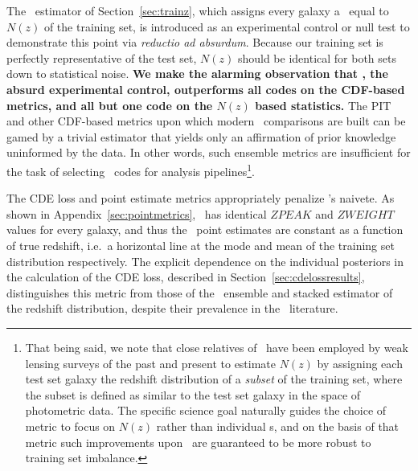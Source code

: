 The \trainz\ estimator of Section~\ref{sec:trainz}, which assigns every galaxy a \pzpdf\ equal to $N(z)$ of the training set, is introduced as an experimental control or null test to demonstrate this point via \textit{reductio ad absurdum}.
Because our training set is perfectly representative of the test set, $N(z)$ should be identical for both sets down to statistical noise.
\textbf{We make the alarming observation that \trainz, the absurd experimental control, outperforms all codes on the CDF-based metrics, and all but one code on the $N(z)$ based statistics.}
The PIT and other CDF-based metrics upon which modern \pzpdf\ comparisons are built \citep{Bordoloi:10,Polsterer:16,Tanaka:17} can be gamed by a trivial estimator that yields only an affirmation of prior knowledge uninformed by the data.
In other words, such ensemble metrics are insufficient for the task of selecting \pzpdf\ codes for analysis pipelines\footnote{That being said, we note that close relatives of \trainz\ have been employed by weak lensing surveys of the past and present \citep{Lima:08, Hildebrandt:17, Hoyle:18} to estimate $N(z)$ by assigning each test set galaxy the redshift distribution of a \emph{subset} of the training set, where the subset is defined as similar to the test set galaxy in the space of photometric data.
The specific science goal naturally guides the choice of metric to focus on $N(z)$ rather than individual \pzpdf s, and on the basis of that metric such improvements upon \trainz\ are guaranteed to be more robust to training set imbalance.}.

The CDE loss and point estimate metrics appropriately penalize \trainz's naivete.
As shown in Appendix~\ref{sec:pointmetrics}, \trainz ~has identical $ZPEAK$ and $ZWEIGHT$ values for every galaxy, and thus the \pz\ point estimates are constant as a function of true redshift, i.e.~a horizontal line at the mode and mean of the training set distribution respectively.
The explicit dependence on the individual posteriors in the calculation of the CDE loss, described in Section~\ref{sec:cdelossresults}, distinguishes this metric from those of the \pzpdf\ ensemble and stacked estimator of the redshift distribution, despite their prevalence in the \pz\ literature.

